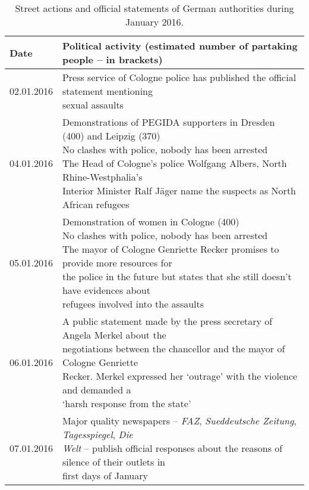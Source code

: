 \begin{table}[ht]%
	\centering
	\caption{Street actions and official statements of German authorities during January 2016.}%
	\label{tab:actionsAndStatementsGermany}%
	\begin{adjustbox}{width=0.9\textwidth}
		\small
		\begin{tabular}{ l  l }%
			\toprule
			Date & Political activity (estimated number of partaking people -- in brackets) \\
			\hline
			02.01.2016 & \makecell[l]{Press service of Cologne police has published the official statement mentioning\\ sexual assaults} \\
			04.01.2016 & \makecell[l]{Demonstrations of PEGIDA supporters in Dresden (400) and Leipzig (370)\\ No clashes with police, nobody has been arrested\\ The Head of Cologne’s police Wolfgang Albers, North Rhine-Westphalia’s\\ Interior Minister Ralf Jäger name the suspects as North African refugees} \\
			05.01.2016 & \makecell[l]{Demonstration of women in Cologne (400) \\ No clashes with police, nobody has been arrested \\ The mayor of Cologne Genriette Recker promises to provide more resources for\\ the police in the future but states that she still doesn’t have evidences about\\ refugees involved into the assaults} \\
			06.01.2016 & \makecell[l]{A public statement made by the press secretary of Angela Merkel about the\\ negotiations between the chancellor and the mayor of Cologne Genriette\\ Recker. Merkel expressed her ‘outrage’ with the violence and demanded a\\ ‘harsh response from the state’} \\
			07.01.2016 & \makecell[l]{Major quality newspapers -- \textit{FAZ}, \textit{Sueddeutsche Zeitung}, \textit{Tagesspiegel}, \textit{Die}\\ \textit{Welt} -- publish official responses about the reasons of silence of their outlets in \\first days of January} \\

\end{tabular}
\end{adjustbox}
\end{table}
